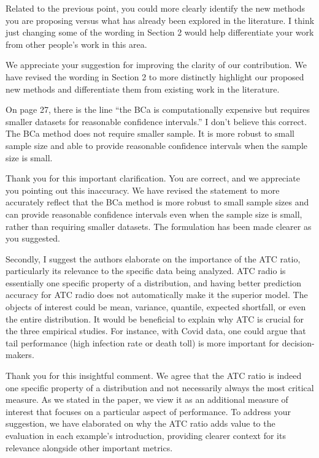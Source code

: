 \documentclass[12pt]{journalrebuttal}
\begin{document}
\begin{revcomment}
    Related to the previous point, you could more clearly identify the new methods you are proposing versus what has already been explored in the literature. I think just changing some of the wording in Section 2 would help differentiate your work from other people's work in this area.
\end{revcomment}
\begin{response}
    We appreciate your suggestion for improving the clarity of our contribution. We have revised the wording in Section 2 to more distinctly highlight our proposed new methods and differentiate them from existing work in the literature.
\end{response}

\begin{revcomment}
On page 27, there is the line \enquote{the BCa is computationally expensive but requires smaller datasets for reasonable confidence intervals.} I don't believe this correct. The BCa method does not require smaller sample. It is more robust to small sample size and able to provide reasonable confidence intervals when the sample size is small.
\end{revcomment}
\begin{response}
    Thank you for this important clarification. You are correct, and we appreciate you pointing out this inaccuracy. We have revised the statement to more accurately reflect that the BCa method is more robust to small sample sizes and can provide reasonable confidence intervals even when the sample size is small, rather than requiring smaller datasets. The formulation has been made clearer as you suggested.
\end{response}


\nextreviewer

\begin{revcomment}
    Secondly, I suggest the authors elaborate on the importance of the ATC ratio, particularly its relevance to the specific data being analyzed. ATC radio is essentially one specific property of a distribution, and having better prediction accuracy for ATC radio does not automatically make it the superior model. The objects of interest could be mean, variance, quantile, expected shortfall, or even the entire distribution. It would be beneficial to explain why ATC is crucial for the three empirical studies. For instance, with Covid data, one could argue that tail performance (high infection rate or death toll) is more important for decision-makers.
\end{revcomment}
\begin{response}
    Thank you for this insightful comment. We agree that the ATC ratio is indeed one specific property of a distribution and not necessarily always the most critical measure. As we stated in the paper, we view it as an additional measure of interest that focuses on a particular aspect of performance. To address your suggestion, we have elaborated on why the ATC ratio adds value to the evaluation in each example's introduction, providing clearer context for its relevance alongside other important metrics.
\end{response}
\end{document}
